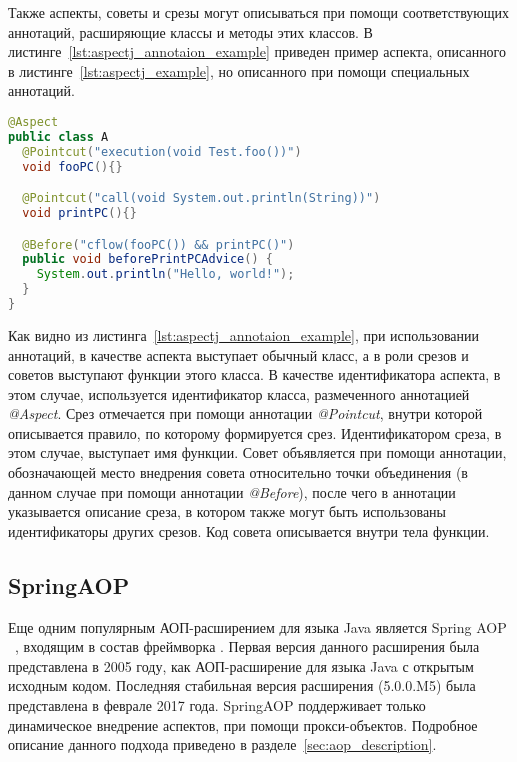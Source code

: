 Также аспекты, советы и срезы могут описываться при помощи соответствующих
аннотаций, расширяющие классы и методы этих классов.
В листинге~\ref{lst:aspectj_annotaion_example} приведен пример аспекта,
описанного в листинге~\ref{lst:aspectj_example}, но описанного при помощи
специальных аннотаций.
  \begin{lstlisting}[language=Java, label={lst:aspectj_annotaion_example}, 
  caption={Пример описания аспектов в AspectJ при помощи аннотаций}]
@Aspect
public class A
  @Pointcut("execution(void Test.foo())")
  void fooPC(){}

  @Pointcut("call(void System.out.println(String))")
  void printPC(){}

  @Before("cflow(fooPC()) && printPC()")
  public void beforePrintPCAdvice() {
    System.out.println("Hello, world!");
  }
}
\end{lstlisting}

Как видно из листинга~\ref{lst:aspectj_annotaion_example}, при использовании
аннотаций, в качестве аспекта выступает обычный класс, а в роли срезов и советов
выступают функции этого класса.
В качестве идентификатора аспекта, в этом случае, используется идентификатор
класса, размеченного аннотацией \textit{@Aspect}.
Срез отмечается при помощи аннотации \textit{@Pointcut}, внутри которой
описывается правило, по которому формируется срез.
Идентификатором среза, в этом случае, выступает имя функции.
Совет объявляется при помощи аннотации, обозначающей место внедрения совета
относительно точки объединения (в данном случае при помощи аннотации
\textit{@Before}), после чего в аннотации указывается описание среза, в котором
также могут быть использованы идентификаторы других срезов.
Код совета описывается внутри тела функции.

\subsection{SpringAOP}
\label{sub:spring_aop_overwiev}
Еще одним популярным АОП-расширением для языка Java является Spring AOP
~\cite{spring_aop}, входящим в состав фреймворка .
Первая версия данного расширения была представлена в 2005 году, как
АОП-расширение для языка Java с открытым исходным кодом.
Последняя стабильная версия расширения (5.0.0.M5) была представлена в феврале
2017 года.
SpringAOP поддерживает только динамическое внедрение аспектов, при помощи
прокси-объектов.
Подробное описание данного подхода приведено в разделе~\ref{sec:aop_description}.

